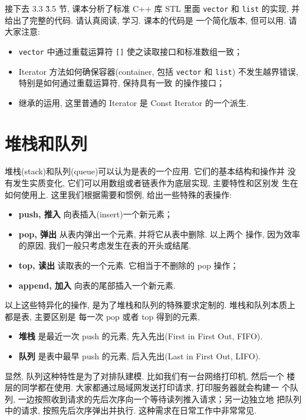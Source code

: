 \documentclass[a4paper]{ctexart}
\theoremstyle{definition}
\theoremstyle{definition}
\begin{document}
接下去 3.3 \~ 3.5 节, 课本分析了标准 C++ 库 STL 里面 \verb|vector| 和
\verb|list| 的实现, 并给出了完整的代码. 请认真阅读, 学习. 课本的代码是
一个简化版本, 但可以用. 请大家注意:

\begin{itemize}
\item \verb|vector| 中通过重载运算符 \verb|[]| 使之读取接口和标准数组一致；
\item Iterator 方法如何确保容器(container, 包括 \verb|vector| 和
  \verb|list|) 不发生越界错误, 特别是如何通过重载运算符, 保持具有一致
  的操作接口；
\item 继承的运用, 这里普通的 Iterator 是 Const Iterator 的一个派生. 
\end{itemize}

\section{堆栈和队列}

堆栈(stack)和队列(queue)可以认为是表的一个应用. 它们的基本结构和操作并
没有发生实质变化, 它们可以用数组或者链表作为底层实现, 主要特性和区别发
生在如何使用上. 这里我们根据需要和惯例, 给出一些特殊的表操作:
\begin{itemize}
  \item {\bf push, 推入} 向表插入(insert)一个新元素；
  \item {\bf pop, 弹出} 从表内弹出一个元素, 并将它从表中删除. 以上两个
    操作, 因为效率的原因, 我们一般只考虑发生在表的开头或结尾.
  \item {\bf top, 读出} 读取表的一个元素. 它相当于不删除的 pop 操作；
  \item {\bf append, 加入} 向表的尾部插入一个新元素.  
\end{itemize}

以上这些特异化的操作, 是为了堆栈和队列的特殊要求定制的. 堆栈和队列本质上都是表, 主要区别是
每一次 pop 或者 top 得到的元素,
\begin{itemize}
\item {\bf 堆栈} 是最近一次 push 的元素, 先入先出(First in First Out,
  FIFO).
\item {\bf 队列} 是表中最早 push 的元素, 后入先出(Last in First Out,
  LIFO).
\end{itemize}

显然, 队列这种特性是为了对排队建模. 比如我们有一台网络打印机, 然后一个
楼层的同学都在使用. 大家都通过局域网发送打印请求, 打印服务器就会构建一
个队列, 一边按照收到请求的先后次序向一个等待读列推入请求；另一边独立地
把队列中的请求, 按照先后次序弹出并执行. 这种需求在日常工作中非常常见.
\end{document}
